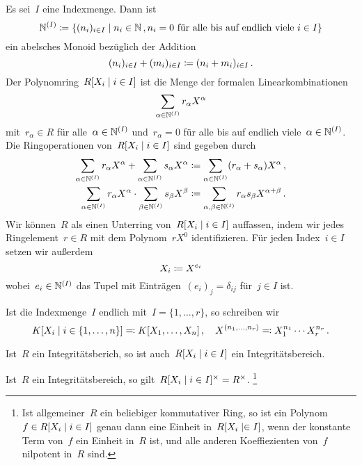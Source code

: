 Es sei~$I$ eine Indexmenge.
Dann ist
\[
  \Natural^{(I)}
  \defined
  \{
    ( n_i )_{i \in I}
  \suchthat
    n_i \in \Natural \,,
    \text{$n_i = 0$ für alle bis auf endlich viele~$i \in I$}
  \}
\]
ein abelsches Monoid bezüglich der Addition
\[
  ( n_i )_{i \in I}
  +
  ( m_i )_{i \in I}
  \coloneqq
  (n_i + m_i)_{i \in I} \,.
\]
Der Polynomring~$R[X_i \suchthat i \in I]$ ist die Menge der formalen Linearkombinationen
\[
  \sum_{\alpha \in \mathbb{N}^{(I)}} r_\alpha X^\alpha
\]
mit~$r_\alpha \in R$ für alle~$\alpha \in \mathbb{N}^{(I)}$ und~$r_\alpha = 0$ für alle bis auf endlich viele~$\alpha \in \mathbb{N}^{(I)}$.
Die Ringoperationen von~$R[X_i \suchthat i \in I]$ sind gegeben durch
\begin{align*}
  \sum_{\alpha \in \mathbb{N}^{(I)}} r_\alpha X^\alpha
  +
  \sum_{\alpha \in \mathbb{N}^{(I)}} s_\alpha X^\alpha
  &\coloneqq
  \sum_{\alpha \in \mathbb{N}^{(I)}} (r_\alpha + s_\alpha) X^\alpha \,,
  \\
  \sum_{\alpha \in \mathbb{N}^{(I)}} r_\alpha X^\alpha
  \cdot
  \sum_{\beta \in \mathbb{N}^{(I)}} s_\beta X^\beta
  &\coloneqq
  \sum_{\alpha, \beta \in \mathbb{N}^{(I)}} r_\alpha s_\beta X^{\alpha + \beta} \,.
\end{align*}
Wir können~$R$ als einen Unterring von~$R[X_i \suchthat i \in I]$ auffassen, indem wir jedes Ringelement~$r \in R$ mit dem  Polynom~$r X^0$ identifizieren.
Für jeden Index~$i \in I$ setzen wir außerdem
\[
  X_i \coloneqq X^{e_i}
\]
wobei~$e_i \in \mathbb{N}^{(I)}$ das Tupel mit Einträgen~$(e_i)_j = \delta_{ij}$ für~$j \in I$ ist.

Ist die Indexmenge~$I$ endlich mit~$I = \{ 1, \dotsc, r \}$, so schreiben wir
\[
  K[X_i \suchthat i \in \{1, \dotsc, n\}]
  \defines
  K[X_1, \dotsc, X_n] \,,
  \quad
  X^{(n_1, \dotsc, n_r)}
  \defines
  X_1^{n_1} \dotsm X_r^{n_r} \,.
\]

\begin{proposition}
  Ist~$R$ ein Integritätsberich, so ist auch~$R[X_i \suchthat i \in I]$ ein Integritätsbereich.
\end{proposition}

\begin{proposition}
  Ist~$R$ ein Integritätsbereich, so gilt~$R[X_i \suchthat i \in I]^\times = R^\times$.%
  \footnote{
    Ist allgemeiner~$R$ ein beliebiger kommutativer Ring, so ist ein Polynom~$f \in R[X_i \suchthat i \in I]$ genau dann eine Einheit in~$R[X_i \suchthat \in I]$, wenn der konstante Term von~$f$ ein Einheit in~$R$ ist, und alle anderen Koeffiezienten von~$f$ nilpotent in~$R$ sind.
  }
\end{proposition}

